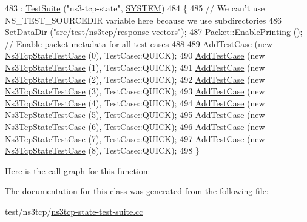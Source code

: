 \begin{DoxyCode}
483   : \hyperlink{classns3_1_1TestSuite_a904b0c40583b744d30908aeb94636d1a}{TestSuite} (\textcolor{stringliteral}{"ns3-tcp-state"}, \hyperlink{classns3_1_1TestSuite_a1ebfcab34ec8161e085e8e3a1855eae0a90c5529a26ab3a5ffcc6e57040dbd82e}{SYSTEM})
484 \{
485   \textcolor{comment}{// We can't use NS\_TEST\_SOURCEDIR variable here because we use subdirectories}
486   \hyperlink{classns3_1_1TestCase_ab002fb0e5071fcde71a92ca9e8224b23}{SetDataDir} (\textcolor{stringliteral}{"src/test/ns3tcp/response-vectors"});
487   Packet::EnablePrinting ();  \textcolor{comment}{// Enable packet metadata for all test cases}
488 
489   \hyperlink{classns3_1_1TestCase_a3718088e3eefd5d6454569d2e0ddd835}{AddTestCase} (\textcolor{keyword}{new} \hyperlink{classNs3TcpStateTestCase}{Ns3TcpStateTestCase} (0), TestCase::QUICK);
490   \hyperlink{classns3_1_1TestCase_a3718088e3eefd5d6454569d2e0ddd835}{AddTestCase} (\textcolor{keyword}{new} \hyperlink{classNs3TcpStateTestCase}{Ns3TcpStateTestCase} (1), TestCase::QUICK);
491   \hyperlink{classns3_1_1TestCase_a3718088e3eefd5d6454569d2e0ddd835}{AddTestCase} (\textcolor{keyword}{new} \hyperlink{classNs3TcpStateTestCase}{Ns3TcpStateTestCase} (2), TestCase::QUICK);
492   \hyperlink{classns3_1_1TestCase_a3718088e3eefd5d6454569d2e0ddd835}{AddTestCase} (\textcolor{keyword}{new} \hyperlink{classNs3TcpStateTestCase}{Ns3TcpStateTestCase} (3), TestCase::QUICK);
493   \hyperlink{classns3_1_1TestCase_a3718088e3eefd5d6454569d2e0ddd835}{AddTestCase} (\textcolor{keyword}{new} \hyperlink{classNs3TcpStateTestCase}{Ns3TcpStateTestCase} (4), TestCase::QUICK);
494   \hyperlink{classns3_1_1TestCase_a3718088e3eefd5d6454569d2e0ddd835}{AddTestCase} (\textcolor{keyword}{new} \hyperlink{classNs3TcpStateTestCase}{Ns3TcpStateTestCase} (5), TestCase::QUICK);
495   \hyperlink{classns3_1_1TestCase_a3718088e3eefd5d6454569d2e0ddd835}{AddTestCase} (\textcolor{keyword}{new} \hyperlink{classNs3TcpStateTestCase}{Ns3TcpStateTestCase} (6), TestCase::QUICK);
496   \hyperlink{classns3_1_1TestCase_a3718088e3eefd5d6454569d2e0ddd835}{AddTestCase} (\textcolor{keyword}{new} \hyperlink{classNs3TcpStateTestCase}{Ns3TcpStateTestCase} (7), TestCase::QUICK);
497   \hyperlink{classns3_1_1TestCase_a3718088e3eefd5d6454569d2e0ddd835}{AddTestCase} (\textcolor{keyword}{new} \hyperlink{classNs3TcpStateTestCase}{Ns3TcpStateTestCase} (8), TestCase::QUICK);
498 \}
\end{DoxyCode}


Here is the call graph for this function\+:




The documentation for this class was generated from the following file\+:\begin{DoxyCompactItemize}
\item 
test/ns3tcp/\hyperlink{ns3tcp-state-test-suite_8cc}{ns3tcp-\/state-\/test-\/suite.\+cc}\end{DoxyCompactItemize}
